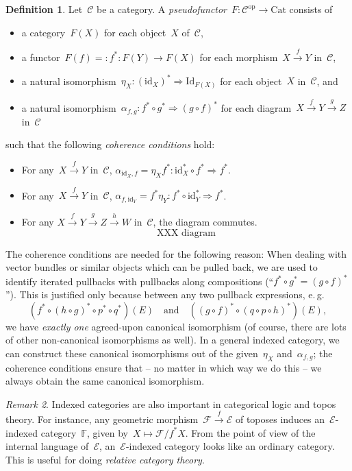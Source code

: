 \documentclass[a4paper,english,12pt]{scrartcl}
\theoremstyle{definition}
\newtheorem{defn}{Definition}[section]
\theoremstyle{plain}
\theoremstyle{remark}
\newtheorem{rem}[defn]{Remark}
\newcommand{\FF}{\mathbb{F}}
\newcommand{\C}{\mathcal{C}}
\newcommand{\E}{\mathcal{E}}
\newcommand{\F}{\mathcal{F}}
\newcommand{\id}{\mathrm{id}}
\newcommand{\op}{\mathrm{op}}
\newcommand{\xra}[1]{\xrightarrow{#1}}
\newcommand{\Cat}{\mathrm{Cat}}
\newcommand{\Id}{\mathrm{Id}}
\begin{document}
\begin{defn}Let~$\C$ be a category. A \emph{pseudofunctor}~$F : \C^\op \to
\Cat$ consists of
\begin{itemize}
\item a category~$F(X)$ for each object~$X$ of~$\C$,
\item a functor~$F(f) =: f^* : F(Y) \to F(X)$ for each morphism~$X \xra{f} Y$ in~$\C$,
\item a natural isomorphism~$\eta_X : (\id_X)^* \Rightarrow \Id_{F(X)}$ for each
object~$X$ in~$\C$, and
\item a natural isomorphism~$\alpha_{f,g} : f^* \circ g^* \Rightarrow (g \circ
f)^*$ for each diagram~$X \xra{f} Y \xra{g} Z$ in~$\C$
\end{itemize}
such that the following \emph{coherence conditions} hold:
\begin{itemize}
\item For any~$X \xra{f} Y$ in~$\C$, $\alpha_{\id_X,f} = \eta_X f^* : \id_X^* \circ f^*
\Rightarrow f^*$.
\item For any~$X \xra{f} Y$ in~$\C$, $\alpha_{f,\id_Y} = f^* \eta_Y : f^* \circ
\id_Y^* \Rightarrow f^*$.
\item For any $X \xra{f} Y \xra{g} Z \xra{h} W$ in~$\C$, the diagram commutes.
\[ \text{XXX diagram} \]
\end{itemize}
\end{defn}

The coherence conditions are needed for the following reason:
When dealing with vector bundles or similar objects which can be pulled back,
we are used to identify iterated pullbacks with pullbacks along compositions
(``$f^* \circ g^* = (g \circ f)^*$'').
This is justified only because between any
two pullback expressions, e.\,g.\@
\[ (f^* \circ (h \circ g)^* \circ p^* \circ q^*)(E) \quad\text{and}\quad
  ((g \circ f)^* \circ (q \circ p \circ h)^*)(E), \]
we have \emph{exactly one} agreed-upon canonical isomorphism (of course, there
are lots of other non-canonical isomorphisms as well). In a general indexed
category, we can construct these canonical isomorphisms out of the
given~$\eta_X$ and~$\alpha_{f,g}$; the coherence conditions ensure that -- no
matter in which way we do this -- we always obtain the same canonical
isomorphism.

\begin{rem}Indexed categories are also important in categorical logic and topos
theory. For instance, any geometric morphism~$\F \xra{f} \E$ of toposes induces
an~$\E$-indexed category~$\FF$, given by~$X \mapsto \F/f^*X$. From the point of
view of the internal language of~$\E$, an~$\E$-indexed category looks like an
ordinary category. This is useful for doing \emph{relative category theory}.
\end{rem}
\end{document}
